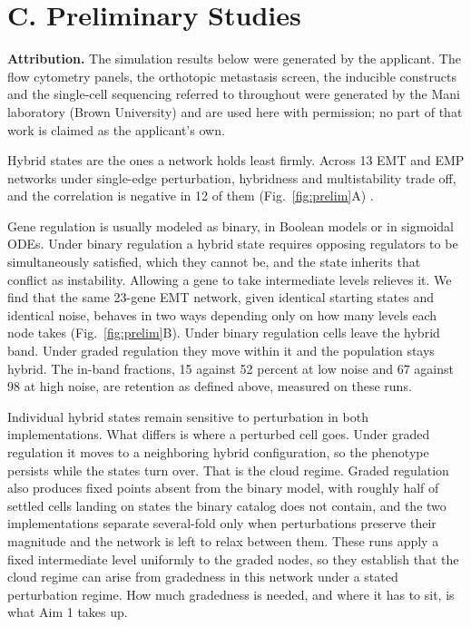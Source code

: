 \documentclass[12pt,letterpaper]{article}
\newcommand{\chg}[1]{\textcolor{chgcolor}{#1}}
\newcommand{\chg}[1]{#1}
\newcommand{\lead}[1]{\textbf{#1}}
\begin{document}
\section{C. Preliminary Studies}

\lead{Attribution.} The simulation results below were generated by the applicant. The flow cytometry panels, the orthotopic metastasis screen, the inducible constructs and the single-cell sequencing referred to throughout were generated by the Mani laboratory (Brown University) and are used here with permission; no part of that work is claimed as the applicant's own.

\chg{Hybrid states are the ones a network holds least firmly. Across 13 EMT and EMP networks under single-edge perturbation, hybridness and multistability trade off, and the correlation is negative in 12 of them (Fig.~\ref{fig:prelim}A) \cite{rashid2022}.

Gene regulation is usually modeled as binary, in Boolean models or in sigmoidal ODEs. Under binary regulation a hybrid state requires opposing regulators to be simultaneously satisfied, which they cannot be, and the state inherits that conflict as instability. Allowing a gene to take intermediate levels relieves it. We find that the same 23-gene EMT network, given identical starting states and identical noise, behaves in two ways depending only on how many levels each node takes (Fig.~\ref{fig:prelim}B). Under binary regulation cells leave the hybrid band. Under graded regulation they move within it and the population stays hybrid. The in-band fractions, 15 against 52 percent at low noise and 67 against 98 at high noise, are retention as defined above, measured on these runs.

Individual hybrid states remain sensitive to perturbation in both implementations. What differs is where a perturbed cell goes. Under graded regulation it moves to a neighboring hybrid configuration, so the phenotype persists while the states turn over. That is the cloud regime. Graded regulation also produces fixed points absent from the binary model, with roughly half of settled cells landing on states the binary catalog does not contain, and the two implementations separate several-fold only when perturbations preserve their magnitude and the network is left to relax between them. These runs apply a fixed intermediate level uniformly to the graded nodes, so they establish that the cloud regime can arise from gradedness in this network under a stated perturbation regime. How much gradedness is needed, and where it has to sit, is what Aim 1 takes up.}
\end{document}
